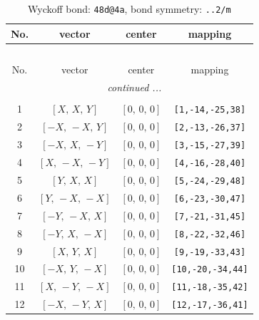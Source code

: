 \documentclass[fleqn,8pt]{jsarticle}
\begin{document}
\begin{longtable}{cccc}
\caption{Wyckoff bond: {\tt 48d@4a}, bond symmetry: {\tt ..2/m}}
 \\
 \hline \hline
No. & vector & center & mapping \\ \hline \endfirsthead

\multicolumn{3}{l}{\tablename\ \thetable{}} \\
 \hline \hline
No. & vector & center & mapping \\ \hline \endhead

 \hline \hline
\multicolumn{3}{r}{\footnotesize\it continued ...} \\ \endfoot

 \hline \hline
\multicolumn{3}{r}{} \\ \endlastfoot

1 & $\left[ X,\, X,\, Y \right]$ & $\left[ 0,\, 0,\, 0 \right]$ & {\tt [1,-14,-25,38]} \\ \hline
2 & $\left[ - X,\, - X,\, Y \right]$ & $\left[ 0,\, 0,\, 0 \right]$ & {\tt [2,-13,-26,37]} \\ \hline
3 & $\left[ - X,\, X,\, - Y \right]$ & $\left[ 0,\, 0,\, 0 \right]$ & {\tt [3,-15,-27,39]} \\ \hline
4 & $\left[ X,\, - X,\, - Y \right]$ & $\left[ 0,\, 0,\, 0 \right]$ & {\tt [4,-16,-28,40]} \\ \hline
5 & $\left[ Y,\, X,\, X \right]$ & $\left[ 0,\, 0,\, 0 \right]$ & {\tt [5,-24,-29,48]} \\ \hline
6 & $\left[ Y,\, - X,\, - X \right]$ & $\left[ 0,\, 0,\, 0 \right]$ & {\tt [6,-23,-30,47]} \\ \hline
7 & $\left[ - Y,\, - X,\, X \right]$ & $\left[ 0,\, 0,\, 0 \right]$ & {\tt [7,-21,-31,45]} \\ \hline
8 & $\left[ - Y,\, X,\, - X \right]$ & $\left[ 0,\, 0,\, 0 \right]$ & {\tt [8,-22,-32,46]} \\ \hline
9 & $\left[ X,\, Y,\, X \right]$ & $\left[ 0,\, 0,\, 0 \right]$ & {\tt [9,-19,-33,43]} \\ \hline
10 & $\left[ - X,\, Y,\, - X \right]$ & $\left[ 0,\, 0,\, 0 \right]$ & {\tt [10,-20,-34,44]} \\ \hline
11 & $\left[ X,\, - Y,\, - X \right]$ & $\left[ 0,\, 0,\, 0 \right]$ & {\tt [11,-18,-35,42]} \\ \hline
12 & $\left[ - X,\, - Y,\, X \right]$ & $\left[ 0,\, 0,\, 0 \right]$ & {\tt [12,-17,-36,41]} \\
\end{longtable}
\renewcommand{\arraystretch}{1.2}
\end{document}
